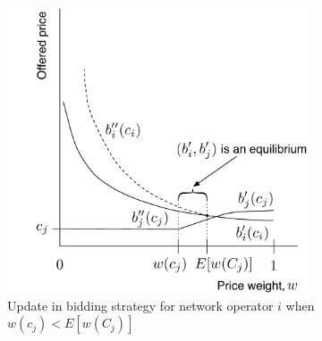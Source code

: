 \begin{figure}[tp!]
	\includegraphics[width=3.5in]{Direct/Figures/pincomplete_bids_update_i_2}
	\caption{Update in bidding strategy for network operator $i$ when $w(c_j) < E[w(C_j)]$}
	\label{fig:pincomplete_bids_update_i_2_direct}
\end{figure}

